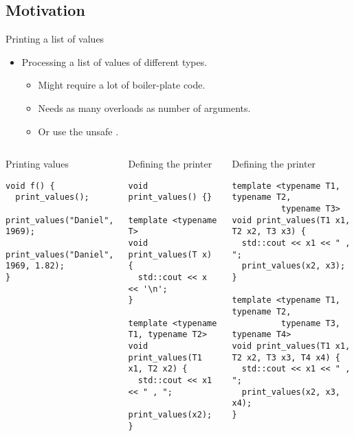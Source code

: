 \subsection{Motivation}

\begin{frame}[t,fragile]{Printing a list of values}
\begin{itemize}
  \item Processing a list of values of different types.
    \begin{itemize}
      \item Might require a lot of boiler-plate code.
      \item Needs as many overloads as number of arguments.
      \item Or use the unsafe .
    \end{itemize}
\end{itemize}

\begin{columns}[T]

\pause
{}
\begin{block}{Printing values}
\begin{lstlisting}
void f() {
  print_values();
  print_values("Daniel", 1969);
  print_values("Daniel", 1969, 1.82);
}
\end{lstlisting}
\end{block}

\pause
{}
\begin{block}{Defining the printer}
\begin{lstlisting}[basicstyle=\tiny]
void print_values() {}

template <typename T>
void print_values(T x) {
  std::cout << x << '\n';
}

template <typename T1, typename T2>
void print_values(T1 x1, T2 x2) {
  std::cout << x1 << " , ";
  print_values(x2);
}
\end{lstlisting}
\end{block}

\begin{block}{Defining the printer}
\begin{lstlisting}[basicstyle=\tiny]
template <typename T1, typename T2, 
          typename T3>
void print_values(T1 x1, T2 x2, T3 x3) {
  std::cout << x1 << " , ";
  print_values(x2, x3);
}

template <typename T1, typename T2, 
          typename T3, typename T4>
void print_values(T1 x1, T2 x2, T3 x3, T4 x4) {
  std::cout << x1 << " , ";
  print_values(x2, x3, x4);
}
\end{lstlisting}
\end{block}

\end{columns}
\end{frame}

